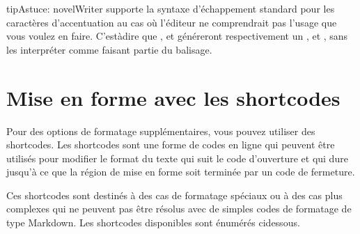 \documentclass[a4paper,11pt,french]{sphinxmanual}
\begin{document}
\begin{sphinxadmonition}{tip}{Astuce:}
\sphinxAtStartPar
novelWriter supporte la syntaxe d’échappement standard pour les caractères d’accentuation au cas où l’éditeur ne comprendrait pas l’usage que vous voulez en faire. C’est\sphinxhyphen{}à\sphinxhyphen{}dire que \sphinxcode{\sphinxupquote{\textbackslash{}*}}, \sphinxcode{\sphinxupquote{\textbackslash{}\_}} et \sphinxcode{\sphinxupquote{\textbackslash{}\textasciitilde{}}} généreront respectivement un \sphinxcode{\sphinxupquote{*}}, \sphinxcode{\sphinxupquote{\_}} et \sphinxcode{\sphinxupquote{\textasciitilde{}}}, sans les interpréter comme faisant partie du balisage.
\end{sphinxadmonition}


\section{Mise en forme avec les shortcodes}
\label{\detokenize{usage_format:formatting-with-shortcodes}}\label{\detokenize{usage_format:a-fmt-shortcodes}}
\sphinxAtStartPar
Pour des options de formatage supplémentaires, vous pouvez utiliser des shortcodes. Les shortcodes sont une forme de codes en ligne qui peuvent être utilisés pour modifier le format du texte qui suit le code d’ouverture et qui dure jusqu’à ce que la région de mise en forme soit terminée par un code de fermeture.

\sphinxAtStartPar
Ces shortcodes sont destinés à des cas de formatage spéciaux ou à des cas plus complexes qui ne peuvent pas être résolus avec de simples codes de formatage de type Markdown. Les shortcodes disponibles sont énumérés ci\sphinxhyphen{}dessous.
\end{document}
